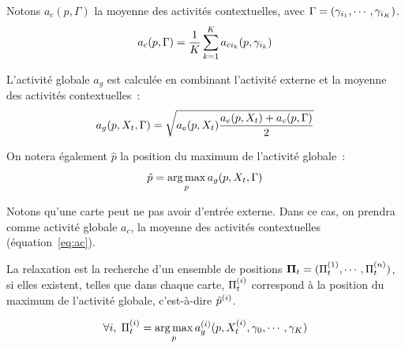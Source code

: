 \documentclass[../main]{subfiles}
\begin{document}
Notons $a_c(p, \Gamma)$ la moyenne des activités contextuelles, avec $\Gamma = (\gamma_{i_1}, \cdots, \gamma_{i_K})$.
\begin{equation}\label{eq:ac}
a_c(p, \Gamma) = \frac{1}{K}\sum_{k=1}^K {a_{ci_k}(p,\gamma_{i_k})}
\end{equation}

L'activité globale $a_g$ est calculée en combinant l'activité externe et la moyenne des activités contextuelles~:
\begin{equation}
\label{eq:global_act}
a_g(p, X_t,\Gamma) = \sqrt{a_e(p, X_t) \frac{a_e(p, X_t) +  a_c(p, \Gamma)}{2}}
\end{equation}

On notera également $\hat{p}$ la position du maximum de l'activité globale~:
\begin{equation}
\label{argmax}
\hat{p} = \operatorname*{arg\,max}_p a_g(p, X_t, \Gamma)
\end{equation}

Notons qu'une carte peut ne pas avoir d'entrée externe. Dans ce cas, on prendra comme activité globale $a_c$, la moyenne des activités contextuelles (équation~\ref{eq:ac}).

La relaxation est la recherche d'un ensemble de positions $\mathbf{\Pi}_t = (\Pi^{({1})}_t, \cdots, \Pi^{({n})}_t)$, si elles existent, telles que dans chaque carte, $\Pi^{({i})}_t$ correspond à la position du maximum de l'activité globale, c'est-à-dire $\hat{p}^{({i})}$.

\begin{equation}
\forall i, \; \Pi^{({i})}_t = \operatorname*{arg\,max}\limits_p a_g^{({i})}(p, X^{({i})}_t, \gamma_0, \cdots, \gamma_K)
\end{equation}
\end{document}
